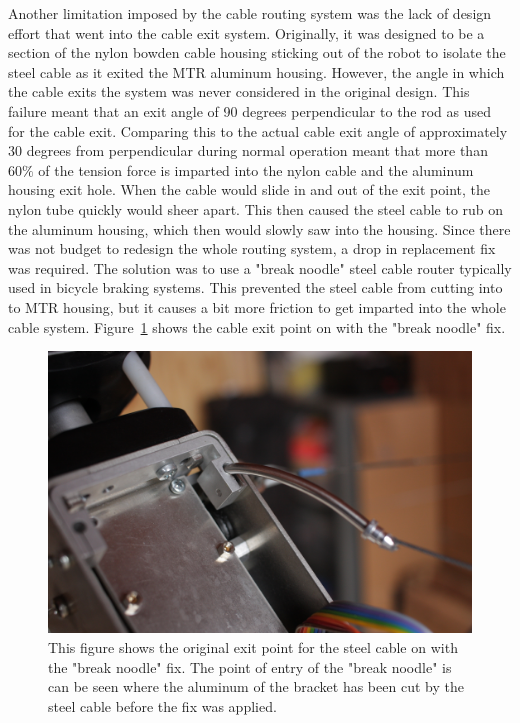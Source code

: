 \begin{appendices}
Another limitation imposed by the cable routing system was the lack of design effort that went into the cable exit system.
Originally, it was designed to be a section of the nylon bowden cable housing sticking out of the robot to isolate the steel cable as it exited the MTR aluminum housing.
However, the angle in which the cable exits the system was never considered in the original \SB{} design. 
This failure meant that an exit angle of 90 degrees perpendicular to the rod as used for the cable exit.
Comparing this to the actual cable exit angle of approximately 30 degrees from perpendicular during normal operation meant that more than \(60\%\) of the tension force is imparted into the nylon cable and the aluminum housing exit hole.
When the cable would slide in and out of the exit point, the nylon tube quickly would sheer apart.
This then caused the steel cable to rub on the aluminum housing, which then would slowly saw into the housing.
Since there was not budget to redesign the whole routing system, a drop in replacement fix was required. 
The solution was to use a "break noodle" steel cable router typically used in bicycle braking systems.
This prevented the steel cable from cutting into to MTR housing, but it causes a bit more friction to get imparted into the whole cable system.
Figure~\ref{fig:cable_output} shows the cable exit point on \SB{} with the "break noodle" fix.

\begin{figure}[thpb]
      \centering
      \includegraphics[width=0.8\columnwidth]{tex/img/bracket_cut}
      \caption{This figure shows the original exit point for the steel cable on \SB{} with the "break noodle" fix. The point of entry of the "break noodle" is can be seen where the aluminum of the bracket has been cut by the steel cable before the fix was applied.}
      \label{fig:cable_output}
\end{figure}


\end{appendices}

